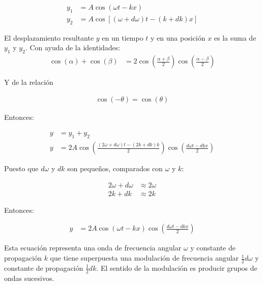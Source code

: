 \documentclass[a4paper]{article}
\begin{document}
    \begin{align}
        y_1 &= A \cos(\omega t - kx) \tag*{} \\[10pt]
        y_2 &= A \cos[(\omega + d\omega) t - (k + dk)x] \tag*{}
    \end{align}

    \indent El desplazamiento resultante $y$ en un tiempo $t$ y en una posición $x$ es la suma de $y_1$ y $y_2$. Con ayuda de la identidades: \\

    \begin{align}
        \cos(\alpha)+\cos(\beta ) &= 2 \cos(\frac{\alpha+\beta}{2})\cos{(\frac{\alpha-\beta}{2})} \tag*{}
    \end{align}

    \indent Y de la relación

    \begin{align}
        \cos(-\theta)=\cos(\theta) \tag*{}
    \end{align}

    \indent Entonces:

    \begin{align}
        y &= y_1 + y_2 \tag*{} \\[10pt]
        y &= 2A \cos(\frac{(2\omega+ d\omega)t-(2k+dk)k}{2})\cos(\frac{d\omega t-dkx}{2}) \tag*{} 
    \end{align}

    \newpage
    \noindent
    \thispagestyle{fancy}

    \indent Puesto que \( d\omega \) y \( dk \) son pequeños, comparados con \( \omega \) y \( k \): 

    \begin{align}
        2\omega + d\omega &\approx 2\omega \tag*{} \\[10pt]
        2k + dk &\approx 2k \tag*{}
    \end{align}

    \indent Entonces:

    \begin{align}
        y &= 2A \cos(\omega t - kx) \cos(\frac{d\omega t - dkx}{2}) \tag*{} 
    \end{align}

    \indent Esta ecuación representa una onda de frecuencia angular \( \omega \) y constante de propagación \( k \) que tiene superpuesta una modulación de frecuencia angular \( \frac{1}{2}d\omega \) y constante de propagación \( \frac{1}{2}dk \). El sentido de la modulación es producir grupos de ondas sucesivos. \\
\end{document}
